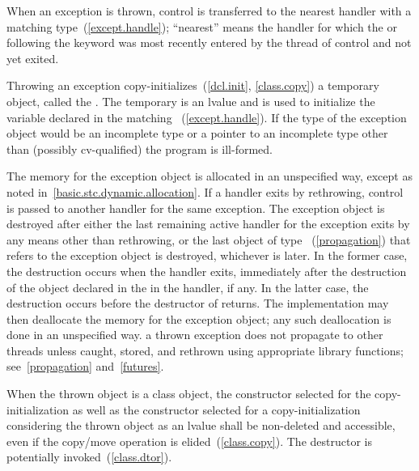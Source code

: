 \pnum
{}%
%
%
When an exception is thrown, control is transferred to the nearest handler with
a matching type~(\ref{except.handle}); ``nearest'' means the handler
for which the
 or
following the
keyword was most recently entered by the thread of control and not yet exited.

\pnum
Throwing an exception
copy-initializes~(\ref{dcl.init}, \ref{class.copy}) a temporary object,
called the
.
The temporary is an lvalue and is used to initialize the
variable declared in the matching
~(\ref{except.handle}).
If the type of the exception object would
be an incomplete type or a pointer to an incomplete
type other than (possibly cv-qualified)
 the program is ill-formed.

\pnum
{}%
%
%
The memory for the exception object is
allocated in an unspecified way, except as noted in~\ref{basic.stc.dynamic.allocation}.
If a handler exits by rethrowing, control is passed to another handler for
the same exception.
The exception object is destroyed after either
the last remaining active handler for the exception exits by
any means other than
rethrowing, or the last object of type ~(\ref{propagation})
that refers to the exception object is destroyed, whichever is later. In the former
case, the destruction occurs when the handler exits, immediately after the destruction
of the object declared in the  in the handler, if any.
In the latter case, the destruction occurs before the destructor of 
returns.
The implementation may then
deallocate the memory for the exception object; any such deallocation
is done in an unspecified way.
\enternote a thrown exception does not
propagate to other threads unless caught, stored, and rethrown using
appropriate library functions; see~\ref{propagation} and~\ref{futures}. \exitnote

\pnum
{}%
%
When the thrown object is a class object, the constructor selected for
the copy-initialization as well as the constructor selected for
a copy-initialization considering the thrown object as an lvalue
shall be non-deleted and accessible, even if the copy/move operation is
elided~(\ref{class.copy}).
The destructor is potentially invoked~(\ref{class.dtor}).


